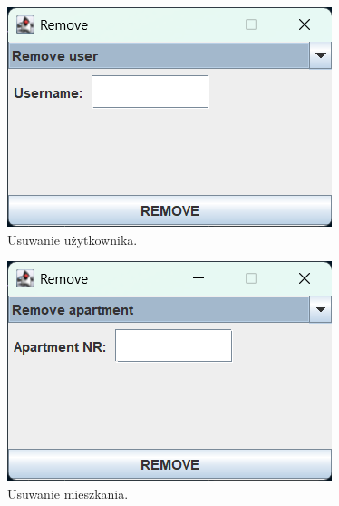 \begin{figure}[H]
    \centering
    \includegraphics[width=\textwidth,height=0.15\textheight,keepaspectratio]{figures/app-images/Remove/remove-user.png}
    \caption{Usuwanie użytkownika.\label{fig15}}
\end{figure}

\begin{figure}[H]
    \centering
    \includegraphics[width=\textwidth,height=0.15\textheight,keepaspectratio]{figures/app-images/Remove/remove-apartment.png}
    \caption{Usuwanie mieszkania.\label{fig16}}
\end{figure}


